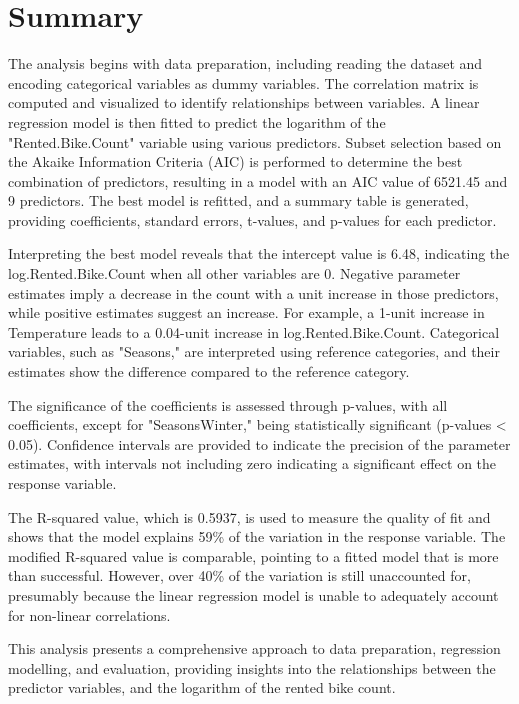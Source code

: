 \documentclass[12 pt]{scrartcl}
\begin{document}
\section{Summary}

The analysis begins with data preparation, including reading the dataset and encoding categorical variables as dummy variables. The correlation matrix is computed and visualized to identify relationships between variables. A linear regression model is then fitted to predict the logarithm of the "Rented.Bike.Count" variable using various predictors. Subset selection based on the Akaike Information Criteria (AIC) is performed to determine the best combination of predictors, resulting in a model with an AIC value of 6521.45 and 9 predictors. The best model is refitted, and a summary table is generated, providing coefficients, standard errors, t-values, and p-values for each predictor.

Interpreting the best model reveals that the intercept value is 6.48, indicating the log.Rented.Bike.Count when all other variables are 0. Negative parameter estimates imply a decrease in the count with a unit increase in those predictors, while positive estimates suggest an increase. For example, a 1-unit increase in Temperature leads to a 0.04-unit increase in log.Rented.Bike.Count. Categorical variables, such as "Seasons," are interpreted using reference categories, and their estimates show the difference compared to the reference category.

The significance of the coefficients is assessed through p-values, with all coefficients, except for "SeasonsWinter," being statistically significant (p-values < 0.05). Confidence intervals are provided to indicate the precision of the parameter estimates, with intervals not including zero indicating a significant effect on the response variable.

The R-squared value, which is 0.5937, is used to measure the quality of fit and shows that the model explains 59\% of the variation in the response variable. The modified R-squared value is comparable, pointing to a fitted model that is more than successful. However, over 40\% of the variation is still unaccounted for, presumably because the linear regression model is unable to adequately account for non-linear correlations.

This analysis presents a comprehensive approach to data preparation, regression modelling, and evaluation, providing insights into the relationships between the predictor variables, and the logarithm of the rented bike count.
\end{document}
